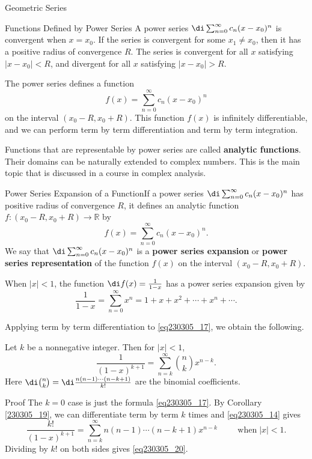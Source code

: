 \begin{example}[label=230305_16]{Geometric Series}
\begin{example}[label=230304_9]{}
\begin{highlight}{Functions Defined by Power Series}
A power series  $\di\sum_{n=0}^{\infty}c_n(x-x_0)^n$ is convergent when $x=x_0$. If the series is convergent for some $x_1\neq x_0$, then it has a positive radius of convergence $R$. The series is convergent for all $x$ satisfying $|x-x_0|<R$, and divergent for all $x$ satisfying $|x-x_0|>R$.\end{highlight}\begin{highlight}{}

The power series defines a function
\[f(x)=\sum_{n=0}^{\infty}c_n(x-x_0)^n\] on the interval $(x_0-R, x_0+R)$. This function $f(x)$ is infinitely differentiable, and we can perform term by term differentiation and term by term integration.

Functions that are representable by power series are called {\bf analytic functions}. Their  domains can be naturally  extended to complex numbers. This is the main topic that is discussed in a course in complex analysis.
\end{highlight}

\begin{definition}{Power Series Expansion of a Function}If a power series $\di\sum_{n=0}^{\infty}c_n(x-x_0)^n$ has positive radius of convergence $R$, it defines an analytic function
$f:(x_0-R,x_0+R)\to\mathbb{R}$ by
\[f(x)= \sum_{n=0}^{\infty}c_n(x-x_0)^n.\]
 We say that $\di\sum_{n=0}^{\infty}c_n(x-x_0)^n$ is a {\bf power series expansion} or {\bf power series representation} of the function $f(x)$ on the interval $(x_0-R, x_0+R)$.
\end{definition}

\begin{example}{} When $|x|<1$,  the function $\di f(x)=\frac{1}{1-x}$ has a power series expansion given by
\begin{equation}\label{eq230305_17}\frac{1}{1-x}=\sum_{n=0}^{\infty}x^n=1+x+x^2+\cdots+x^n+\cdots.\end{equation}
\end{example}

Applying term by term differentiation to \eqref{eq230305_17}, we obtain the following.

\begin{theorem}[label=230307_1]{}
Let $k$ be a nonnegative integer. Then for $|x|<1$, 
\begin{equation}\label{eq230305_20}\frac{1}{(1-x)^{k+1}} =\sum_{n=k}^{\infty}\binom{n}{k}x^{n-k}.\end{equation}Here
$\di \binom{n}{k}=\di \frac{n(n-1)\cdots(n-k+1)}{k!}$ are the binomial coefficients.
\end{theorem}
\begin{myproof}{Proof}
The $k=0$ case is just the formula \eqref{eq230305_17}. By Corollary \ref{230305_19}, we can differentiate term by term $k$ times and \eqref{eq230305_14} gives
\[\frac{k!}{(1-x)^{k+1}}=\sum_{n=k}^{\infty}n(n-1)\cdots (n-k+1)x^{n-k}\hspace{1cm}\text{when}\;|x|<1.\]
Dividing by $k!$ on both sides gives \eqref{eq230305_20}.
\end{myproof}


\end{example}
\end{example}
